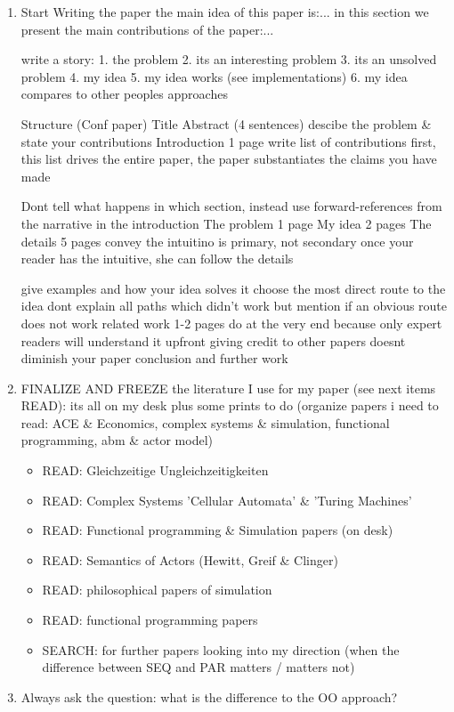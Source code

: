 \begin{enumerate}
\item Start Writing the paper
the main idea of this paper is:...
in this section we present the main contributions of the paper:...

write a story:
	1. the problem
	2. its an interesting problem
	3. its an unsolved problem
	4. my idea
	5. my idea works (see implementations)
	6. my idea compares to other peoples approaches
	
Structure (Conf paper)
	Title
	Abstract (4 sentences)
		descibe the problem & state your contributions
	Introduction 1 page
		write list of contributions first,
		this list drives the entire paper,
		the paper substantiates the claims you have made
		
		Dont tell what happens in which section,
		instead use forward-references from the
		narrative in the introduction
	The problem 1 page
	My idea 2 pages
	The details 5 pages
		convey the intuitino is primary, not secondary
		once your reader has the intuitive, she can follow the details
		
		give examples and how your idea solves it
		choose the most direct route to the idea
			dont explain all paths which didn't work
			but mention if an obvious route does not work
	related work 1-2 pages
		do at the very end because only expert readers will understand it upfront
		giving credit to other papers doesnt diminish your paper
	conclusion and further work


\item FINALIZE AND FREEZE the literature I use for my paper (see next items READ): its all on my desk plus some prints to do (organize papers i need to read: ACE \& Economics, complex systems \& simulation, functional programming, abm \& actor model)
	\begin{itemize}
		\item READ: Gleichzeitige Ungleichzeitigkeiten
		\item READ: Complex Systems 'Cellular Automata' \& 'Turing Machines'
		\item READ: Functional programming \& Simulation papers (on desk)
		\item READ: Semantics of Actors (Hewitt, Greif \& Clinger)
		\item READ: philosophical papers of simulation
		\item READ: functional programming papers
		\item SEARCH: for further papers looking into my direction (when the difference between SEQ and PAR matters / matters not)
	\end{itemize}

\item Always ask the question: what is the difference to the OO approach? 
\end{enumerate} 

